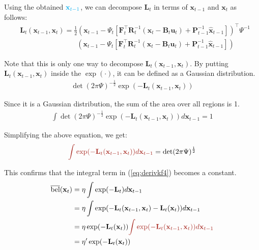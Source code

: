 \documentclass[10pt]{article}
\begin{document}
Using the obtained ${\color{Cyan} \mathbf{x}_{t-1}}$, we can decompose $\mathbf{L}_t$ in terms of $\mathbf{x}_{t-1}$ and $\mathbf{x}_t$ as follows:
\begin{equation} 
	\boxed{ \begin{aligned} 
			&\mathbf{L}_t(\mathbf{x}_{t-1}, \mathbf{x}_t) = \frac{1}{2}(\mathbf{x}_{t-1} - { \Psi_t[ \mathbf{F}_t^{\intercal}\mathbf{R}_t^{-1}(\mathbf{x}_t - \mathbf{B}_t \mathbf{u}_t) + \mathbf{P}_{t-1}^{-1}\hat{\mathbf{x}}_{t-1} ] })^{\intercal} \Psi^{-1} \\
			&\qquad\qquad\qquad\qquad (\mathbf{x}_{t-1} - { \Psi_t[ \mathbf{F}_t^{\intercal}\mathbf{R}_t^{-1}(\mathbf{x}_t - \mathbf{B}_t \mathbf{u}_t) + \mathbf{P}_{t-1}^{-1}\hat{\mathbf{x}}_{t-1} ] } )
	\end{aligned}  }
\end{equation}

Note that this is only one way to decompose $\mathbf{L}_t(\mathbf{x}_{t-1}, \mathbf{x}_t)$. By putting $\mathbf{L}_t(\mathbf{x}_{t-1}, \mathbf{x}_t)$ inside the $\exp(\cdot)$, it can be defined as a Gaussian distribution.
\begin{equation} 
	\begin{aligned} 
		\det(2\pi \Psi)^{-\frac{1}{2}} \exp(-\mathbf{L}_t(\mathbf{x}_{t-1}, \mathbf{x}_t))
	\end{aligned} 
\end{equation}

Since it is a Gaussian distribution, the sum of the area over all regions is 1.
\begin{equation} 
	\begin{aligned} 
		\int \det(2\pi \Psi)^{-\frac{1}{2}} \exp(-\mathbf{L}_t(\mathbf{x}_{t-1}, \mathbf{x}_t)) d\mathbf{x}_{t-1} = 1
	\end{aligned} 
\end{equation}

Simplifying the above equation, we get:
\begin{equation} 
	\begin{aligned} 
		{\color{Mahogany}  \int  \exp(-\mathbf{L}_t(\mathbf{x}_{t-1}, \mathbf{x}_t)) d\mathbf{x}_{t-1} } = \det(2\pi \Psi)^{\frac{1}{2}}
	\end{aligned} 
\end{equation}

This confirms that the integral term in (\ref{eq:derivkf4}) becomes a constant.
\begin{equation} 
	\begin{aligned} 
		\overline{\text{bel}}(\mathbf{x}_{t}) & = \eta \int \exp(-\mathbf{L}_{t}) d \mathbf{x}_{t-1}  \\
		& = \eta \int \exp(-\mathbf{L}_t(\mathbf{x}_{t-1}, \mathbf{x}_t) - \mathbf{L}_t(\mathbf{x}_t)) d \mathbf{x}_{t-1} \\
		& = \eta \exp(-\mathbf{L}_t(\mathbf{x}_t)) {\color{Mahogany} \int \exp(-\mathbf{L}_t(\mathbf{x}_{t-1}, \mathbf{x}_t)) d \mathbf{x}_{t-1} } \\
		& = \eta' \exp(-\mathbf{L}_t(\mathbf{x}_t))
	\end{aligned} 
\end{equation}
\end{document}
